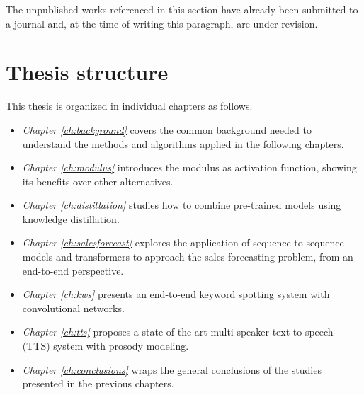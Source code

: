 The unpublished works referenced in this section have already been submitted to a journal and, at the time of writing this paragraph, are under revision.

\section{Thesis structure}
This thesis is organized in individual chapters as follows.


\begin{itemize}
	\item \textit{Chapter \ref{ch:background}} covers the common background needed to understand the methods and algorithms applied in the following chapters.
	\item \textit{Chapter \ref{ch:modulus}} introduces the modulus as activation function, showing its benefits over other alternatives.
	\item \textit{Chapter \ref{ch:distillation}} studies how to combine pre-trained models using knowledge distillation.
	\item \textit{Chapter \ref{ch:salesforecast}} explores the application of sequence-to-sequence models and transformers to approach the sales forecasting problem, from an end-to-end perspective. 
	\item \textit{Chapter \ref{ch:kws}} presents an end-to-end keyword spotting system with convolutional networks.
	\item \textit{Chapter \ref{ch:tts}} proposes a state of the art multi-speaker text-to-speech (TTS) system with prosody modeling.
	\item \textit{Chapter \ref{ch:conclusions}} wraps the general conclusions of the studies presented in the previous chapters.
\end{itemize}


     


